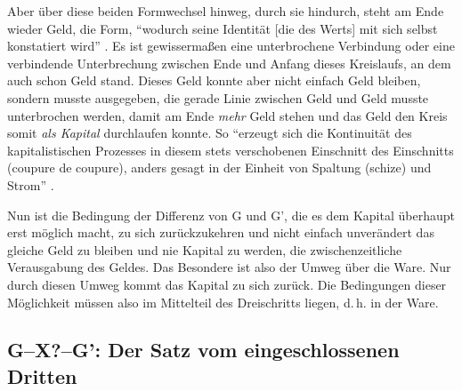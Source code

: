 \documentclass[12pt,
               paper=a4,
               twoside=false,
               onehalfspacing,
               bibliography=totoc,
               toc=graduated,
               ]{scrartcl}
\newcommand{\pc}[2]{\parencite[#1]{#2}}
\newcommand{\worries}[1]{\ifdraft{\textcolor{blue}{\texttt{(#1)}}}{}}
\newcommand{\gwg}{G--W--G'\xspace}
\newcommand{\cic}{Connect -- I -- cut\xspace}
\begin{document}

Aber über diese beiden Formwechsel hinweg, durch sie hindurch, steht
am Ende wieder Geld, die Form, "`wodurch seine Identität [die des
Werts] mit sich selbst konstatiert wird"' \pc{169}{kap}. Es ist
gewissermaßen eine unterbrochene Verbindung oder eine verbindende
Unterbrechung zwischen Ende und Anfang dieses Kreislaufs, an dem auch
schon Geld stand. Dieses Geld konnte aber nicht einfach Geld bleiben,
sondern musste ausgegeben, die gerade Linie zwischen Geld und Geld
musste unterbrochen werden, damit am Ende \emph{mehr} Geld stehen und
das Geld den Kreis somit \emph{als Kapital} durchlaufen konnte. So
"`erzeugt sich die Kontinuität des kapitalistischen Prozesses in
diesem stets verschobenen Einschnitt des Einschnitts (coupure de
coupure), anders gesagt in der Einheit von Spaltung (schize) und
Strom"' \pc{296}{ao}.


Nun ist die Bedingung der Differenz von G und G', die es dem Kapital
überhaupt erst möglich macht, zu sich zurückzukehren und nicht einfach
unverändert das gleiche Geld zu bleiben und nie Kapital zu werden, die
zwischenzeitliche Verausgabung des Geldes. Das Besondere ist also der
Umweg über die Ware. Nur durch diesen Umweg kommt das Kapital zu sich
zurück. Die Bedingungen dieser Möglichkeit müssen also im Mittelteil
des Dreischritts liegen, d.\,h. in der Ware.






\subsection{G--X?--G': Der Satz vom eingeschlossenen Dritten}


\end{document}
